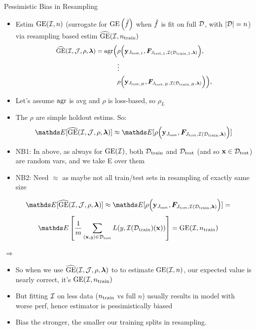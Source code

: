 \documentclass[11pt,compress,t,notes=noshow, xcolor=table]{beamer}
\begin{document}
\begin{vbframe}{Pessimistic Bias in Resampling}
\begin{itemize}
    \item Estim $\GE(\ind, n)$ (surrogate for $\GEf$ when $\fh$ is fit on full $\D$, with $|\D|=n$) via resampling based estim
        $\GEh(\ind, \ntrain)$
\begin{equation*}
\small
\begin{split}
\GEhresa = \agr\Big(
 &\rho\Big(\yv_{\Jtesti[1]}, \FJtestftraini[1]\Big), \\ &\large{\vdots} \\
& \rho\Big(\yv_{\Jtesti[B]}, \FJtestftraini[B]\Big)
    \Big),
\end{split}
\end{equation*}
\item Let's assume $\agr$ is avg and $\rho$ is loss-based, so $\rho_L$ 
\item The $\rho$ are simple holdout estims. So:
$$\E[\GEhresa] \approx \E[\rho\Big(\yv_{\Jtest}, \FJtestftrain\Big)] $$
\end{itemize}

\begin{itemize}
    \footnotesize
\item NB1: In above, as always for $\GE(\ind)$, both $\Dtrain$ and $\Dtest$ (and so $\xv \in \Dtest$) are random vars, and we take E over them 
\item NB2: Need $\approx$ as maybe not all train/test sets in resampling of exactly same size
\end{itemize}

\framebreak


\framebreak

$$\E[\GEhresa] \approx \E[\rho\Big(\yv_{\Jtest}, \FJtestftrain\Big)] = $$
$$  \E \left[ \frac{1}{m} \sum_{\xy \in \Dtest} L(y, \ind(\Dtrain)(\xv)) \right] = \GE(\ind, \ntrain)$$



$\Rightarrow$

\begin{itemize}
    \item So when we use $\GEhresa$ to to estimate $\GE(\ind, n)$, our expected value is nearly correct, it's $\GE(\ind, \ntrain)$
    \item But fitting $\ind$ on less data ($\ntrain$ vs full $n$) usually results in model with worse perf, hence estimator is pessimistically biased 
    \item Bias the stronger, the smaller our training splits in resampling.
\end{itemize}
\end{vbframe}
\end{document}

